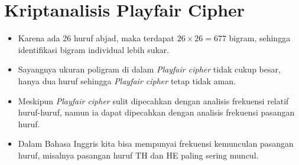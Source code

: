\documentclass{article}
\begin{document}

\section*{Kriptanalisis Playfair Cipher}

\begin{itemize}
    \item Karena ada 26 huruf abjad, maka terdapat $26 \times 26 = 677$ bigram, sehingga identifikasi bigram individual lebih sukar.
    \item Sayangnya ukuran poligram di dalam \textit{Playfair cipher} tidak cukup besar, hanya dua huruf sehingga \textit{Playfair cipher} tetap tidak aman.
    \item Meskipun \textit{Playfair cipher} sulit dipecahkan dengan analisis frekuensi relatif huruf-huruf, namun ia dapat dipecahkan dengan analisis frekuensi pasangan huruf.
    \item Dalam Bahasa Inggris kita bisa mempunyai frekuensi kemunculan pasangan huruf, misalnya pasangan huruf TH dan HE paling sering muncul.
\end{itemize}
\end{document}
